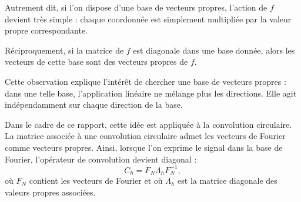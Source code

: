 Autrement dit, si l'on dispose d'une base de vecteurs propres, l'action de $f$ devient très simple :
chaque coordonnée est simplement multipliée par la valeur propre correspondante.

Réciproquement, si la matrice de $f$ est diagonale dans une base donnée, alors les vecteurs de cette
base sont des vecteurs propres de $f$.

Cette observation explique l'intérêt de chercher une base de vecteurs propres : dans une telle base,
l'application linéaire ne mélange plus les directions. Elle agit indépendamment sur chaque direction
de la base.

Dans le cadre de ce rapport, cette idée est appliquée à la convolution circulaire. La matrice associée
à une convolution circulaire admet les vecteurs de Fourier comme vecteurs propres. Ainsi, lorsque
l'on exprime le signal dans la base de Fourier, l'opérateur de convolution devient diagonal :
\[
C_h = F_N \Lambda_h F_N^{-1},
\]
où $F_N$ contient les vecteurs de Fourier et où $\Lambda_h$ est la matrice diagonale des valeurs
propres associées.